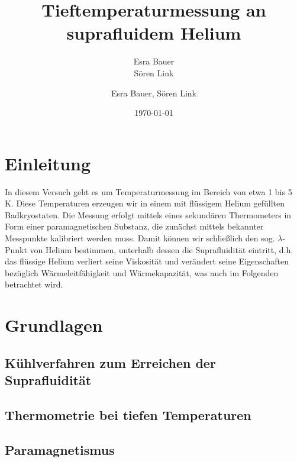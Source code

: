 \documentclass[bigchapter,colorback,accentcolor=tud4b,linedtoc,11pt]{tudreport}
\title{Tieftemperaturmessung an suprafluidem Helium}
\subtitle{Esra Bauer \\Sören Link}
\author{Esra Bauer, Sören Link}
\date{\today}
\begin{document}

\maketitle

\tableofcontents


\chapter{Einleitung}

In diesem Versuch geht es um Temperaturmessung im Bereich von etwa 1 bis 5 K. Diese Temperaturen erzeugen wir in einem mit flüssigem Helium gefüllten Badkryostaten. Die Messung erfolgt mittels eines sekundären Thermometers in Form einer paramagnetischen Substanz, die zunächst mittels bekannter Messpunkte kalibriert werden muss. Damit können wir schließlich den sog. $\lambda$-Punkt von Helium bestimmen, unterhalb dessen die Suprafluidität eintritt, d.h. das flüssige Helium verliert seine Viskosität und verändert seine Eigenschaften bezüglich Wärmeleitfähigkeit und Wärmekapazität, was auch im Folgenden betrachtet wird.

\chapter{Grundlagen}

\section{Kühlverfahren zum Erreichen der Suprafluidität}

\section{Thermometrie bei tiefen Temperaturen}

\section{Paramagnetismus}
\end{document}
